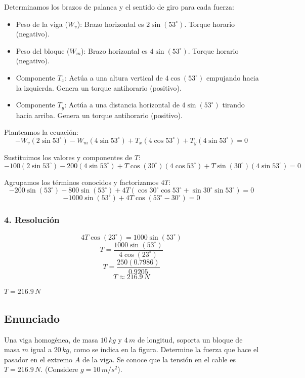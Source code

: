 \documentclass[12pt, a4paper]{article}
\begin{document}
Determinamos los brazos de palanca y el sentido de giro para cada fuerza:
\begin{itemize}
    \item Peso de la viga ($W_v$): Brazo horizontal es $2 \sin(53^\circ)$. Torque horario (negativo).
    \item Peso del bloque ($W_m$): Brazo horizontal es $4 \sin(53^\circ)$. Torque horario (negativo).
    \item Componente $T_x$: Actúa a una altura vertical de $4 \cos(53^\circ)$ empujando hacia la izquierda. Genera un torque antihorario (positivo).
    \item Componente $T_y$: Actúa a una distancia horizontal de $4 \sin(53^\circ)$ tirando hacia arriba. Genera un torque antihorario (positivo).
\end{itemize}

Planteamos la ecuación:
$$-W_v (2 \sin 53^\circ) - W_m (4 \sin 53^\circ) + T_x (4 \cos 53^\circ) + T_y (4 \sin 53^\circ) = 0$$

Sustituimos los valores y componentes de $T$:
$$-100 (2 \sin 53^\circ) - 200 (4 \sin 53^\circ) + T \cos(30^\circ) (4 \cos 53^\circ) + T \sin(30^\circ) (4 \sin 53^\circ) = 0$$

Agrupamos los términos conocidos y factorizamos $4T$:
$$-200 \sin(53^\circ) - 800 \sin(53^\circ) + 4T \left( \cos 30^\circ \cos 53^\circ + \sin 30^\circ \sin 53^\circ \right) = 0$$
$$-1000 \sin(53^\circ) + 4T \cos(53^\circ - 30^\circ) = 0$$

\subsubsection*{4. Resolución}
$$4T \cos(23^\circ) = 1000 \sin(53^\circ)$$
$$T = \frac{1000 \sin(53^\circ)}{4 \cos(23^\circ)}$$
$$T = \frac{250 (0.7986)}{0.9205}$$
$$T \approx 216.9 \, \si{N}$$

\begin{tcolorbox}[colback=green!5!white, colframe=green!50!black, title=Respuesta Final]
\centering \Large $T = 216.9 \, \si{N}$
\end{tcolorbox}

\newpage

\subsection*{Enunciado}
Una viga homogénea, de masa $10 \, \si{kg}$ y $4 \, \si{m}$ de longitud, soporta un bloque de masa $m$ igual a $20 \, \si{kg}$, como se indica en la figura. Determine la fuerza que hace el pasador en el extremo $A$ de la viga. Se conoce que la tensión en el cable es $T = 216.9 \, \si{N}$. (Considere $g=10\,\si{m/s^2}$).
\end{document}
